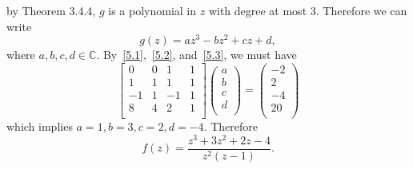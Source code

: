 \documentclass[12pt]{article}
\begin{document}
by Theorem 3.4.4, $g$ is a polynomial in $z$ with degree at most $3$. Therefore we can write
\[ g(z) = az^{3} - bz^{2} + cz + d, \]
where $a,b,c,d \in \mathbb{C}$. By~\eqref{5.1},~\eqref{5.2}, and~\eqref{5.3}, we must have
\[
\begin{bmatrix}
0 & 0 & 1 & 1 \\
1 & 1 & 1 & 1 \\
-1 & 1 & -1 & 1 \\
8 & 4 & 2 & 1 \\
\end{bmatrix}\left( \begin{array}{c}
a \\
b \\
c \\
d \\
\end{array} \right) = \left(\begin{array}{r}
-2 \\
2 \\
-4 \\
20 \\
\end{array} \right)
\]
which implies $a = 1, b = 3, c = 2, d = -4$. Therefore
\[ f(z) = \frac{z^{3} + 3z^{2} + 2z - 4}{z^{2}(z-1)}. \]


\newpage
\end{document}
